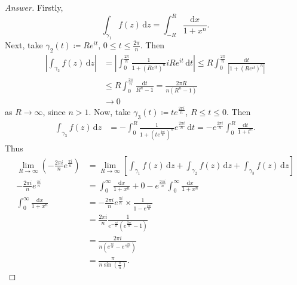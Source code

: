 \documentclass[12pt]{article}
\newcommand\paren[1]{\left( #1 \right)}
\newcommand{\sqbrack}[1]{\left [ #1 \right ]}
\newcommand{\abs}[1]{\left| #1 \right|}
\theoremstyle{definition}
\begin{document}
\begin{proof}[Answer]
    Firstly, 
    \[
        \int_{\gamma_1} f(z) \, \mathrm{d}z = \int_{-R}^R \frac{\mathrm{d}x}{1+x^n}.
    \]
    Next, take $\gamma_2(t) \coloneqq Re^{it}$, $0 \leq t \leq \frac{2\pi}{n}$. Then 
    \begin{align*}
        \abs{ \int_{\gamma_2} f(z) \, \mathrm{d}z } & = \abs{ \int_0^{\frac{2\pi }{n}} \frac{1}{1+\paren{Re^{it} }^n} iRe^{it} \, \mathrm{d}t } \leq R \int_0^{\frac{2\pi }{n}} \frac{ \mathrm{d}t }{ \abs{ 1+\paren{Re^{it} }^n } } \\
        & \leq R \int_0^{\frac{2\pi }{n}} \frac{ \mathrm{d}t }{ R^n - 1 } = \frac{2\pi R}{n\paren{R^n-1}} \\
        & \to 0
    \end{align*}
    as $R \to \infty$, since $n > 1$. Now, take $\gamma_3(t) \coloneqq te^{\frac{2\pi i}{n}}$, $R \leq t \leq 0$. Then 
    \begin{align*}
        \int_{\gamma_3} f(z) \, \mathrm{d}z & = -\int_0^R \frac{1}{1+\paren{te^{\frac{2\pi i}{n}}}^n} e^{\frac{2\pi i}{n}} \, \mathrm{d}t = -e^{\frac{2\pi i}{n}} \int_0^R \frac{ \mathrm{d}t }{ 1+t^n }.
    \end{align*}
    Thus 
    \begin{align*}
        \lim\limits_{R \to \infty} \paren{ -\frac{2\pi i}{n} e^{\frac{\pi i}{n}} } & = \lim\limits_{R \to \infty} \sqbrack{ \int_{\gamma_1} f(z) \, \mathrm{d}z + \int_{\gamma_2} f(z) \, \mathrm{d}z + \int_{\gamma_3} f(z) \, \mathrm{d}z }  \\
        -\frac{2\pi i}{n} e^{\frac{\pi i}{n}} & = \int_0^{\infty} \frac{\mathrm{d}x}{1+x^n} + 0 - e^{\frac{2\pi i}{n}} \int_0^{\infty} \frac{ \mathrm{d}x }{ 1+x^n } \\
        \int_0^{\infty} \frac{ \mathrm{d}x }{ 1+x^n } & = -\frac{2\pi i}{n} e^{\frac{\pi i}{n}} \times \frac{1}{1-e^{\frac{2\pi i}{n}}} \\
        & = \frac{2\pi i}{n} \frac{1}{e^{-\frac{\pi i}{n}} \paren{ e^{\frac{2\pi i}{n}} - 1 } } \\
        & = \frac{2\pi i}{n \paren{ e^{\frac{\pi i}{n}} - e^{\frac{-\pi i}{n}} }} \\
        & = \boxed{ \frac{\pi}{n \sin\paren{\frac{\pi}{n}}} }.
    \end{align*} 
\end{proof}
\end{document}
